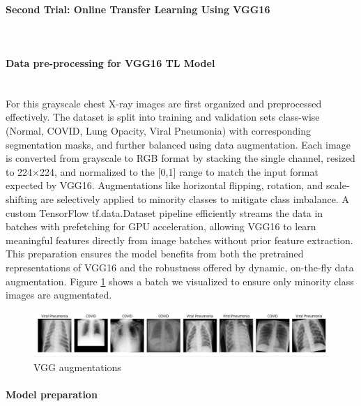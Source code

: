 \documentclass{article}
\begin{document}
\paragraph{Second Trial: Online Transfer Learning Using VGG16}\mbox{}\\
\paragraph{Data pre-processing for VGG16 TL Model}\mbox{}\\

 For this grayscale chest X-ray images are first organized and preprocessed effectively. The dataset is split into training and validation sets class-wise (Normal, COVID, Lung Opacity, Viral Pneumonia) with corresponding segmentation masks, and further balanced using data augmentation. Each image is converted from grayscale to RGB format by stacking the single channel, resized to 224×224, and normalized to the [0,1] range to match the input format expected by VGG16. Augmentations like horizontal flipping, rotation, and scale-shifting are selectively applied to minority classes to mitigate class imbalance. A custom TensorFlow tf.data.Dataset pipeline efficiently streams the data in batches with prefetching for GPU acceleration, allowing VGG16 to learn meaningful features directly from image batches without prior feature extraction. This preparation ensures the model benefits from both the pretrained representations of VGG16 and the robustness offered by dynamic, on-the-fly data augmentation.
Figure \ref{fig:vgg16augmentations.png} shows a batch we visualized to ensure only minority class images are augmentated.

\begin{figure}[h!] %
    \centering
    \includegraphics[width=1.0\linewidth]{vgg16augmentations.png}
    \caption{VGG augmentations}
    \label{fig:vgg16augmentations.png}
\end{figure}
\paragraph{Model preparation}\mbox{}\\
\end{document}
